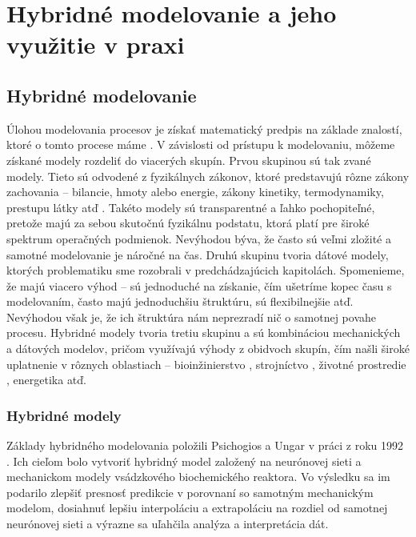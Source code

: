 \part{Hybridné modelovanie a jeho využitie v praxi}
\chapter{Hybridné modelovanie}
Úlohou modelovania procesov je získať matematický predpis na základe znalostí, ktoré o tomto procese máme \cite{hangos:process_modelling:2001}. V závislosti od prístupu k modelovaniu, môžeme získané modely rozdeliť do viacerých skupín. Prvou skupinou sú tak zvané  modely. Tieto sú odvodené z fyzikálnych zákonov, ktoré predstavujú rôzne zákony zachovania -- bilancie, hmoty alebo energie, zákony kinetiky, termodynamiky, prestupu látky atď \cite{bangi:chem_engineer:2020}. Takéto modely sú transparentné a ľahko pochopiteľné, pretože majú za sebou skutočnú fyzikálnu podstatu, ktorá platí pre široké spektrum
operačných podmienok. Nevýhodou býva, že často sú veľmi zložité a samotné modelovanie je náročné na čas. Druhú skupinu tvoria dátové modely, ktorých problematiku sme rozobrali v predchádzajúcich kapitolách. Spomenieme, že majú viacero výhod -- sú jednoduché na získanie, čím ušetríme
kopec času s modelovaním, často majú jednoduchšiu štruktúru, sú flexibilnejšie atď. Nevýhodou však je, že ich štruktúra nám neprezradí nič o samotnej povahe procesu. Hybridné modely tvoria tretiu skupinu a  sú kombináciou mechanických a dátových modelov, pričom využívajú výhody z obidvoch skupín, čím našli široké uplatnenie v rôznych oblastiach -- bioinžinierstvo \cite{srivastava:hybrid_biomolecules:2020}, strojníctvo \cite{liu:hybrid_vehicle:2020}, životné prostredie \cite{liu:hybrid_waste_water:2019}, energetika \cite{qian:hybrid_energy:2019} atď.

\section{Hybridné modely}
Základy hybridného modelovania položili Psichogios a Ungar v práci  z roku 1992 \cite{psichogios:hybrid_process_model:1992}. Ich cieľom bolo vytvoriť hybridný model založený na neurónovej sieti a mechanickom 
modely vsádzkového biochemického reaktora. Vo výsledku sa im podarilo zlepšiť presnosť predikcie v porovnaní so samotným mechanickým modelom, dosiahnuť lepšiu interpoláciu a extrapoláciu na rozdiel
od samotnej neurónovej sieti a výrazne sa uľahčila analýza a interpretácia dát.

